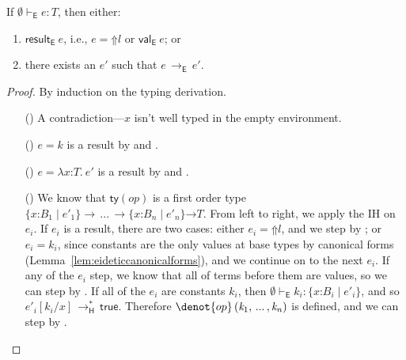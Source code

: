 \documentclass[9pt]{extarticle}
\newcommand{\ottnt}[1]{\mathit{#1}}
\newcommand{\ottmv}[1]{\mathit{#1}}
\newcommand{\ottsym}[1]{#1}
\begin{document}
\begin{lemma}
  \label{lem:eideticprogress}
  If $ \emptyset   \vdash _{  \mathsf{E}  }  \ottnt{e}  :  \ottnt{T} $, then either:
  \begin{enumerate}
  \item $ \mathsf{result} _{  \mathsf{E}  }~ \ottnt{e} $, i.e., $\ottnt{e}  \ottsym{=}   \mathord{\Uparrow}  \ottnt{l} $ or $ \mathsf{val} _{  \mathsf{E}  }~ \ottnt{e} $;
    or
  \item there exists an $\ottnt{e'}$ such that $\ottnt{e} \,  \longrightarrow _{  \mathsf{E}  }  \, \ottnt{e'}$.
  \end{enumerate}
\begin{proof}
    By induction on the typing derivation.
{\iffull
    \begin{itemize}
    \item[(\T{Var})] A contradiction---$\mathit{x}$ isn't well typed in the
      empty environment.

    \item[(\T{Const})] $\ottnt{e}  \ottsym{=}  \ottnt{k}$ is a result by  and .

    \item[(\T{Abs})] $\ottnt{e}  \ottsym{=}   \lambda \mathit{x} \mathord{:} \ottnt{T} .~  \ottnt{e'} $ is a result by  and .

    \item[(\T{Op})] We know that $ \mathsf{ty} (\mathord{ \ottnt{op} }) $ is a first order type
      $ {}   \{ \mathit{x} \mathord{:} \ottnt{B_{{\mathrm{1}}}} \mathrel{\mid} \ottnt{e'_{{\mathrm{1}}}} \}   \rightarrow \, ... \, \rightarrow   \{ \mathit{x} \mathord{:} \ottnt{B_{\ottmv{n}}} \mathrel{\mid} \ottnt{e'_{\ottmv{n}}} \}   {} \mathord{ \rightarrow } \ottnt{T} $.
From left to right, we apply the IH on $\ottnt{e_{\ottmv{i}}}$. If $\ottnt{e_{\ottmv{i}}}$ is
      a result, there are two cases: either $\ottnt{e_{\ottmv{i}}}  \ottsym{=}   \mathord{\Uparrow}  \ottnt{l} $, and
      we step by ; or $\ottnt{e_{\ottmv{i}}}  \ottsym{=}  \ottnt{k_{\ottmv{i}}}$, since constants are
      the only values at base types by canonical forms
      (Lemma~\ref{lem:eideticcanonicalforms}), and we continue on to
      the next $\ottnt{e_{\ottmv{i}}}$. If any of the $\ottnt{e_{\ottmv{i}}}$ step, we know that all
      of terms before them are values, so we can step by
      . If all of the $\ottnt{e_{\ottmv{i}}}$ are constants $\ottnt{k_{\ottmv{i}}}$, then
      $ \emptyset   \vdash _{  \mathsf{E}  }  \ottnt{k_{\ottmv{i}}}  :   \{ \mathit{x} \mathord{:} \ottnt{B_{\ottmv{i}}} \mathrel{\mid} \ottnt{e'_{\ottmv{i}}} \}  $, and so $ \ottnt{e'_{\ottmv{i}}}  [  \ottnt{k_{\ottmv{i}}} / \mathit{x}  ]  \,  \longrightarrow ^{*}_{  \mathsf{H}  }  \,  \mathsf{true} $. Therefore $\denot{ op } \, \ottsym{(}  \ottnt{k_{{\mathrm{1}}}}  \ottsym{,} \, ... \, \ottsym{,}  \ottnt{k_{\ottmv{n}}}  \ottsym{)}$ is defined, and we
      can step by .


\end{itemize}}
\end{proof}
\end{lemma}
\end{document}
